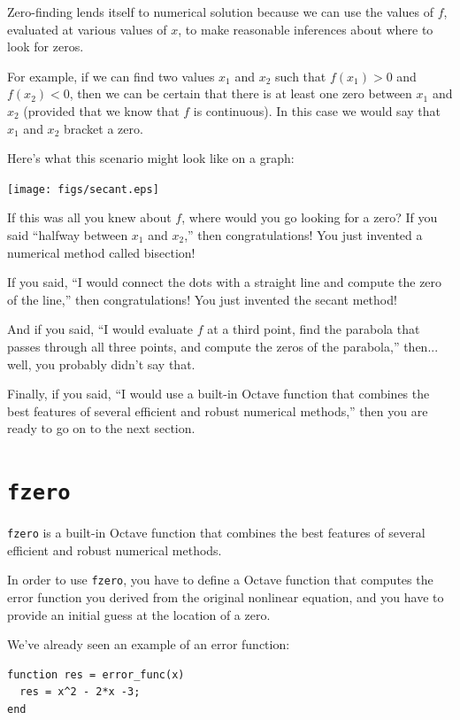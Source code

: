 \documentclass{book}
\begin{document}
Zero-finding lends itself to numerical solution because we can
use the values of $f$, evaluated at various values of $x$, to
make reasonable inferences about where to look for zeros.

For example, if we can find two values $x_1$ and $x_2$ such that
$f(x_1) > 0$ and $f(x_2) < 0$, then we can be certain that there is at
least one zero between $x_1$ and $x_2$ (provided that we know that $f$
is continuous). In this case we would say that $x_1$ and $x_2$
bracket a zero.

Here's what this scenario might look like on a graph:

\beforefig \centerline{\texttt{[image: figs/secant.eps]}}

If this was all you knew about $f$, where would you go looking for
a zero? If you said ``halfway between $x_1$ and $x_2$,'' then
congratulations! You just invented a numerical method called
bisection!

If you said, ``I would connect the dots with a straight line
and compute the zero of the line,'' then
congratulations! You just invented the secant method!

And if you said, ``I would evaluate $f$ at a third point, find the
parabola that passes through all three points, and compute the zeros
of the parabola,'' then... well, you probably didn't say that.

Finally, if you said, ``I would use a built-in Octave function that
combines the best features of several efficient and robust
numerical methods,'' then you are ready to go on to the next section.


\section{{\tt fzero}}
\label{fzero}

{\tt fzero} is a built-in Octave function that
combines the best features of several efficient and robust
numerical methods.

In order to use {\tt fzero}, you have to define a Octave function
that computes the error function you derived from the original
nonlinear equation, and you have to provide an initial guess at
the location of a zero.

We've already seen an example of an error function:

\begin{verbatim}
function res = error_func(x)
  res = x^2 - 2*x -3;
end
\end{verbatim}
\end{document}
